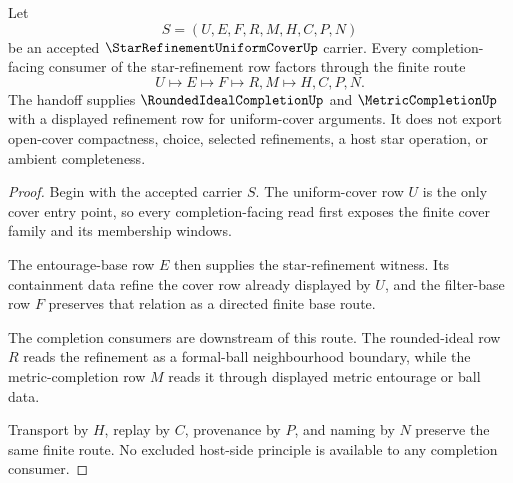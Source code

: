 \begin{theorem}
\label{thm:star-refinement-uniform-cover-completion-handoff}
Let
$$
S=(U,E,F,R,M,H,C,P,N)
$$
be an accepted $\StarRefinementUniformCoverUp$ carrier. Every completion-facing consumer of the star-refinement row factors through the finite route
$$
U\longmapsto E\longmapsto F\longmapsto R,M\longmapsto H,C,P,N .
$$
The handoff supplies $\RoundedIdealCompletionUp$ and $\MetricCompletionUp$ with a displayed refinement row for uniform-cover arguments. It does not export open-cover compactness, choice, selected refinements, a host star operation, or ambient completeness.
\end{theorem}
\begin{proof}
Begin with the accepted carrier $S$. The uniform-cover row $U$ is the only cover entry point, so every completion-facing read first exposes the finite cover family and its membership windows.

The entourage-base row $E$ then supplies the star-refinement witness. Its containment data refine the cover row already displayed by $U$, and the filter-base row $F$ preserves that relation as a directed finite base route.

The completion consumers are downstream of this route. The rounded-ideal row $R$ reads the refinement as a formal-ball neighbourhood boundary, while the metric-completion row $M$ reads it through displayed metric entourage or ball data.

Transport by $H$, replay by $C$, provenance by $P$, and naming by $N$ preserve the same finite route. No excluded host-side principle is available to any completion consumer.
\end{proof}

